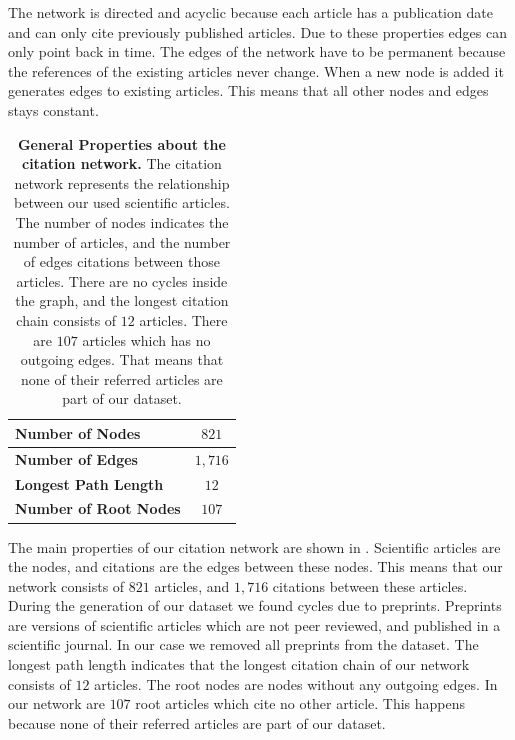 The network is directed and acyclic because each article has a publication date and can only cite previously published articles. Due to these properties edges can only point back in time. The edges of the network have to be permanent because the references of the existing articles never change. When a new node is added it generates edges to existing articles. This means that all other nodes and edges stays constant.

\begin{table}[!b]
  \caption[General Properties about the citation network]{\textbf{General Properties about the citation network.} The citation network represents the relationship between our used scientific articles. The number of nodes indicates the number of articles, and the number of edges citations between those articles. There are no cycles inside the graph, and the longest citation chain consists of $12$ articles. There are $107$ articles which has no outgoing edges. That means that none of their referred articles are part of our dataset.}
  \centering
  \begin{tabular}{ l c }
    \toprule
    \textbf{Number of Nodes}      & $821$  \\ \midrule
    \textbf{Number of Edges}      & $1,716$ \\ \midrule
    \textbf{Longest Path Length}  & $12$   \\ \midrule
    \textbf{Number of Root Nodes} & $107$  \\
    \bottomrule
  \end{tabular}
  \label{tbl:general_properties_about_the_graph}
\end{table}

The main properties of our citation network are shown in . Scientific articles are the nodes, and citations are the edges between these nodes. This means that our network consists of $821$ articles, and $1,716$ citations between these articles. During the generation of our dataset we found cycles due to preprints. Preprints are versions of scientific articles which are not peer reviewed, and published in a scientific journal. In our case we removed all preprints from the dataset. The longest path length indicates that the longest citation chain of our network consists of $12$ articles. The root nodes are nodes without any outgoing edges. In our network are $107$ root articles which cite no other article. This happens because none of their referred articles are part of our dataset.

